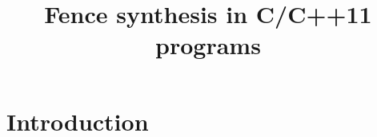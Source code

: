 \documentclass{article}
\begin{document}
\title{Fence synthesis in C/C++11 programs}
\maketitle 

\section{Introduction} \label{sec:intro}

\end{document}
